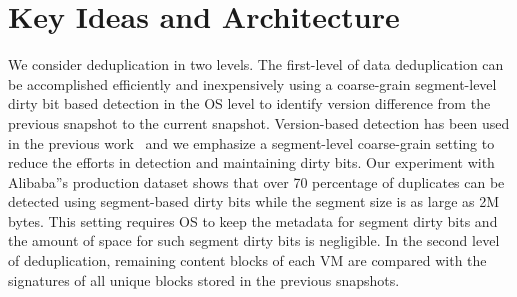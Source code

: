 \section{ Key Ideas and Architecture}
\label{sect:arch}




We consider deduplication in two levels. The first-level of data deduplication can be accomplished efficiently and 
inexpensively using a coarse-grain segment-level  dirty bit based detection in the OS level  to 
identify version difference from the previous snapshot to the current snapshot.  
Version-based detection has been used in the previous work~\cite{Clements2009,Vrable2009,TanIPDPS2011} and
we emphasize a segment-level coarse-grain setting to reduce the efforts in detection and maintaining dirty bits. 
Our experiment with Alibaba''s production dataset shows that over 70 percentage of 
duplicates can be detected using segment-based dirty bits while the segment size is as large as 2M bytes.  
This setting requires OS to keep the metadata for segment dirty bits and the amount of space for such segment 
dirty bits is negligible. In the second level of deduplication, remaining content blocks of each VM 
are compared with the signatures of all unique  blocks stored in the previous snapshots.

